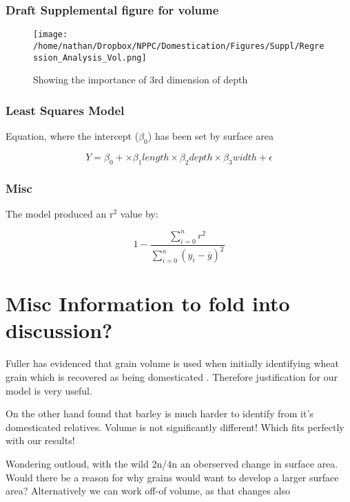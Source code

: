 \documentclass[a4paper, twocolumn]{article}
\begin{document}
\subsubsection{Draft Supplemental figure for volume}
\label{sec:org3729e91}
\begin{figure}[htbp]
\centering
\texttt{[image: /home/nathan/Dropbox/NPPC/Domestication/Figures/Suppl/Regression\_Analysis\_Vol.png]}
\caption{\label{fig:org154c3db}
Showing the importance of 3rd dimension of depth}
\end{figure}

\subsubsection{Least Squares Model}
\label{sec:orged0c1ed}

Equation, where the intercept (\(\beta_{\text{0}}\)) has been set by surface area

$$ Y = \beta_0 + \times \beta_1 length \times \beta_2 depth \times \beta_3 width  + \epsilon $$

\subsubsection{Misc}
\label{sec:org90888db}
The model produced an r\(^{\text{2}}\) value by:

$$1- \frac{\sum\limits_{i=0}^{n}{r^2}}{\sum\limits_{i=0}^{n}{(y_i - \overline{y})^2 }}$$



\section{Misc Information to fold into discussion?}
\label{sec:org225b393}

Fuller has evidenced that grain volume is used when initially identifying wheat grain which is recovered as being domesticated \cite{Fuller2007} .
Therefore justification for our model is very useful.

On the other hand \cite{Willcox2004} found that barley is much harder to identify from it's domesticated relatives.
 Volume is not significantly different! Which fits perfectly with our results!

Wondering outloud, with the wild 2n/4n an oberserved change in surface area. Would there be a
reason for why grains would want to develop a larger surface area? Alternatively we can work off-of volume, as that changes also

\clearpage
\onecolumn
\end{document}
